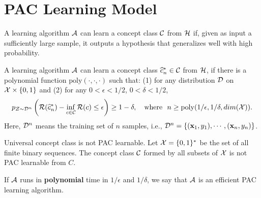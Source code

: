 \section{PAC Learning Model}
A learning algorithm $\mathcal{A}$ can learn a concept class $\mathcal{C}$ from $\mathcal{H}$ if, given as input a sufficiently large sample, it outputs a hypothesis that generalizes well with high probability.
\begin{definition}
	A learning algorithm $\mathcal{A}$ can learn a concept class $\widehat{c}^*_n \in \mathcal{C}$ from $\mathcal{H}$, if there is a polynomial function $\mathrm{poly}(\cdot, \cdot, \cdot)$ such that: (1) for any distribution $\mathcal{D}$ on $\mathcal{X} \times \{0, 1\}$ and (2) for any $0 < \epsilon < 1/2$, $0 < \delta < 1/2$,
\begin{equation}
	p_{Z \sim \mathcal{D}^n}\left( \mathcal{R}(\widehat{c}^*_n) - \inf_{c \in \mathcal{C}} \mathcal{R}(c) \leq \epsilon \right) \geq 1 - \delta, \quad \text{where}\ \  n \geq \mathrm{poly}(1/\epsilon, 1/\delta, dim(\mathcal{X})).
\end{equation}
Here, $\mathcal{D}^n$ means the training set of $n$ samples, i.e., $\mathcal{D}^n = \{(\mathbf{x}_1, y_1), \cdots,  (\mathbf{x}_n, y_n)\}$.
\end{definition}
\begin{property}
	Universal concept class is not PAC learnable. Let $\mathcal{X} = \{0, 1\}^*$ be the set of all finite binary sequences. The concept class $\mathcal{C}$ formed by all subsets of $\mathcal{X}$ is not PAC learnable from $C$.
\end{property}

\begin{definition}
	If $\mathcal{A}$ runs in \textbf{polynomial} time in $1/\epsilon$ and $1/\delta$, we say that $\mathcal{A}$ is an  efficient PAC learning algorithm.
\end{definition}

